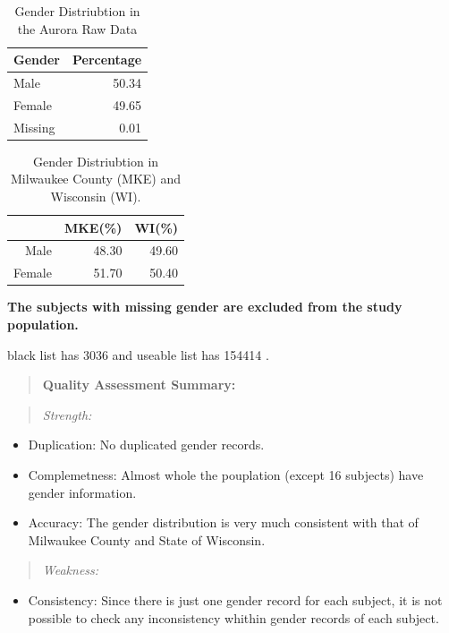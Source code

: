\documentclass{article}
\begin{document}
\begin{table}[ht]
\centering
\begin{tabular}{lr}
  \hline
Gender & Percentage \\ 
  \hline
Male & 50.34 \\ 
  Female & 49.65 \\ 
  Missing & 0.01 \\ 
   \hline
\end{tabular}
\caption{Gender Distriubtion in the Aurora Raw Data} 
\label{Table:1}
\end{table}%
\begin{table}[ht]
\centering
\begin{tabular}{rrr}
  \hline
 & MKE(\%) & WI(\%) \\ 
  \hline
Male & 48.30 & 49.60 \\ 
  Female & 51.70 & 50.40 \\ 
   \hline
\end{tabular}
\caption{Gender Distriubtion in Milwaukee County (MKE) and Wisconsin (WI).} 
\label{Table:1}
\end{table}

\textbf{The subjects with missing gender are excluded from the study population.}

black list has 3036 and useable list has 154414 .
\newpage

\begin{quote}
\textbf{Quality Assessment Summary:}
\end{quote}
\begin{quote}
\emph{Strength:}
\end{quote}
\begin{itemize}
  \item Duplication: No duplicated gender records.
  \item Complemetness: Almost whole the pouplation (except 16 subjects) have gender information.
  \item Accuracy: The gender distribution is very much consistent with that of Milwaukee County and State of Wisconsin.
\end{itemize}
\begin{quote}
\emph{Weakness:}
\end{quote}
\begin{itemize}
  \item Consistency: Since there is just one gender record for each subject, it is not possible to check any inconsistency whithin gender records of each subject.
\end{itemize}
\end{document}
